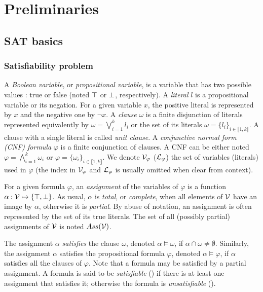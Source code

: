 \chapter{Preliminaries}\label{chap:preliminaries}

\section{SAT basics}

\subsection{Satisfiability problem}
A \emph{Boolean variable}, or \emph{propositional variable}, is a variable that
has two possible values : true or false (noted $\top$ or $\bot$,
respectively).  A \emph{literal} $l$ is a propositional variable or its
negation. For a given variable $x$, the positive literal is represented by $x$
and the negative one by $\neg x$.
A \emph{clause} $\omega$ is a finite disjunction of literals represented
equivalently by $\omega = \bigvee_{i=1}^k l_i$ or the set of its literals
$\omega = \{l_i\}_{i \in \llbracket 1,k \rrbracket}$. A clause with a single
literal is called \emph{unit clause}.
A \emph{conjunctive normal form (CNF) formula} $\varphi$ is a finite
conjunction of clauses.  A CNF can be either noted $\varphi = \bigwedge_{i=1}^k
\omega_i$ or $\varphi = \{\omega_i\}_{i \in \llbracket 1,k \rrbracket}$. We
denote $\mathcal{V}_\varphi$ ($\mathcal{L}_\varphi$) the set of variables (literals) used in
$\varphi$ (the index in $\mathcal{V}_\varphi$ and $\mathcal{L}_\varphi$ is usually omitted when
clear from context).

For a given formula $\varphi$, an \emph{assignment} of the variables of
$\varphi$ is a function $\alpha: \mathcal{V} \mapsto \{ \top, \bot \}$.  As usual, $\alpha$ is
\emph{total}, or \emph{complete}, when all elements of $\mathcal{V}$ have an image by
$\alpha$, otherwise it is \emph{partial}. By abuse of notation, an assignment is
often represented by the set of its true literals.  The set of all (possibly
partial) assignments of $\mathcal{V}$ is noted $Ass(\mathcal{V})$.

The assignment $\alpha$ \emph{satisfies} the clause $\omega$, denoted $\alpha
\models \omega$, if $\alpha \cap \omega \neq \emptyset$. Similarly, the assignment
$\alpha$ satisfies the propositional formula $\varphi$, denoted $\alpha \models
\varphi$, if $\alpha$ satisfies all the clauses of $\varphi$. Note that a
formula may be satisfied by a partial assignment. A formula is said to be
\emph{satisfiable} (\sat) if there is at least one assignment that satisfies it;
otherwise the formula is \emph{unsatisfiable} (\unsat).

